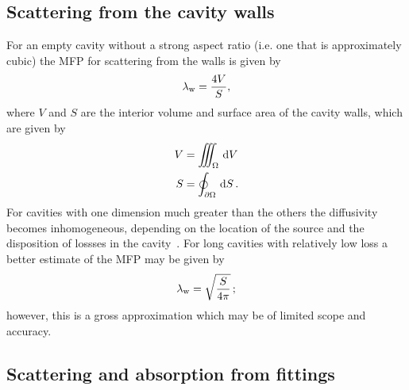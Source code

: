 \documentclass[a4paper]{article}
\numberwithin{equation}{section}
\providecommand\oiint{\oint}
\begin{document}
\subsection[Scattering from the cavity walls]{Scattering from the cavity walls}
\label{sc:sum:walls}

For an empty cavity without a strong aspect ratio (i.e. one that is approximately cubic) 
the MFP for scattering from the walls is given by~\citep{Navarro2015}
\begin{align}
\lambda_{\mathrm{w}} = \frac{4V}{S},
\end{align}
where $V$ and $S$ are the interior volume and surface area of the cavity
walls, which are given by
\begin{align}
V &= \iiint_{\Omega }\dif{V} \\
S &= \oiint_{\partial\Omega }\dif{S}\,.
\end{align}
For cavities with one dimension much greater than the others the diffusivity becomes inhomogeneous, 
depending on the location of the source and the disposition of lossses in the cavity~\citep{Visentin2012,Visentin2015}.
For long cavities with relatively low loss a better estimate of the MFP may be given by
\begin{align}
\lambda_{\mathrm{w}} = \sqrt{\frac{S}{4\pi}}\,;
\end{align}
however, this is a gross approximation which may be of limited scope and accuracy.

\subsection[Scattering and absorption from fittings]{Scattering and absorption from fittings}
\label{sc:sum:fit}
\end{document}
